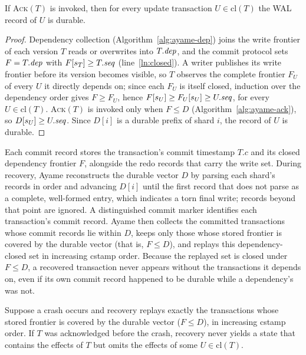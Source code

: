 \begin{lemma}
\label{lem:closure}
If \textsc{Ack}$(T)$ is invoked, then for every update transaction
$U \in \mathrm{cl}(T)$ the WAL record of $U$ is durable.
\end{lemma}

\begin{proof}
Dependency collection (Algorithm~\ref{alg:ayame-dep}) joins the write
frontier of each version $T$ reads or overwrites into $T.\mathit{dep}$, and the
commit protocol sets $F = T.\mathit{dep}$ with $F[s_T] \ge T.\mathit{seq}$
(line~\ref{ln:closed}).  A writer publishes its write frontier before
its version becomes visible, so $T$ observes the complete frontier
$F_U$ of every $U$ it directly depends on; since each $F_U$ is itself
closed, induction over the dependency order gives $F \ge F_U$, hence
$F[s_U] \ge F_U[s_U] \ge U.\mathit{seq}$, for every $U \in \mathrm{cl}(T)$.
\textsc{Ack}$(T)$ is invoked only when $F \le D$
(Algorithm~\ref{alg:ayame-ack}), so $D[s_U] \ge U.\mathit{seq}$.  Since $D[i]$
is a durable prefix of shard $i$, the record of $U$ is durable.
\end{proof}

Each commit record stores the transaction's commit timestamp $T.c$ and
its closed dependency frontier $F$, alongside the redo records that carry
the write set.  During recovery, Ayame reconstructs the durable vector
$D$ by parsing each shard's records in order and advancing $D[i]$ until
the first record that does not parse as a complete, well-formed entry,
which indicates a torn final write; records beyond that point are
ignored.  A distinguished commit marker identifies each transaction's
commit record.  Ayame then collects the committed transactions whose
commit records lie within $D$, keeps only those whose stored frontier is
covered by the durable vector (that is, $F \le D$), and replays this
dependency-closed set in increasing cstamp order.  Because the replayed
set is closed under $F \le D$, a recovered transaction never appears
without the transactions it depends on, even if its own commit record
happened to be durable while a dependency's was not.

\begin{theorem}
\label{thm:recover}
Suppose a crash occurs and recovery replays exactly the transactions whose
stored frontier is covered by the durable vector ($F \le D$), in increasing
cstamp order.  If $T$ was acknowledged before the crash,
recovery never yields a state that contains the effects of $T$ but omits
the effects of some $U \in \mathrm{cl}(T)$.
\end{theorem}

